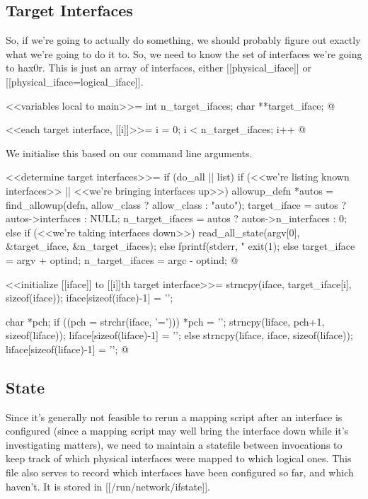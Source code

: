 \documentclass{article}
\begin{document}
\subsection{Target Interfaces}

So, if we're going to actually do something, we should probably figure
out exactly what we're going to do it to. So, we need to know the set
of interfaces we're going to hax0r. This is just an array of interfaces,
either [[physical_iface]] or [[physical_iface=logical_iface]].

<<variables local to main>>=
int n_target_ifaces;
char **target_iface;
@ 

<<each target interface, [[i]]>>=
i = 0; i < n_target_ifaces; i++
@

We initialise this based on our command line arguments.

<<determine target interfaces>>=
if (do_all || list) {
	if (<<we're listing known interfaces>>
            || <<we're bringing interfaces up>>) {
		allowup_defn *autos = find_allowup(defn, allow_class ? allow_class : "auto");
		target_iface = autos ? autos->interfaces : NULL;
		n_target_ifaces = autos ? autos->n_interfaces : 0;
	} else if (<<we're taking interfaces down>>) {
		read_all_state(argv[0], &target_iface, &n_target_ifaces);
	} else {
		fprintf(stderr, "%
		exit(1);
	}	
} else {
	target_iface = argv + optind;
	n_target_ifaces = argc - optind;
}
@ 

<<initialize [[iface]] to [[i]]th target interface>>=
strncpy(iface, target_iface[i], sizeof(iface));
iface[sizeof(iface)-1] = '\0';

{
	char *pch;
	if ((pch = strchr(iface, '='))) {
		*pch = '\0';
		strncpy(liface, pch+1, sizeof(liface));
		liface[sizeof(liface)-1] = '\0';
	} else {
		strncpy(liface, iface, sizeof(liface));
		liface[sizeof(liface)-1] = '\0';
	}
}
@ 

\subsection{State}

Since it's generally not feasible to rerun a mapping script after an
interface is configured (since a mapping script may well bring the
interface down while it's investigating matters), we need to maintain a
statefile between invocations to keep track of which physical interfaces
were mapped to which logical ones.  This file also serves to record
which interfaces have been configured so far, and which haven't.  It
is stored in [[/run/network/ifstate]].
\end{document}
